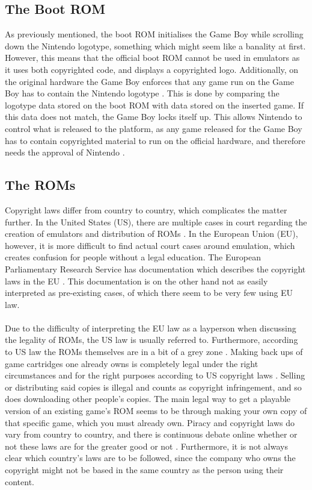 \subsection{The Boot ROM}
As previously mentioned, the boot ROM initialises the Game Boy while scrolling down the Nintendo logotype, something which might seem like a banality at first. However, this means that the official boot ROM cannot be used in emulators as it uses both copyrighted code, and displays a copyrighted logo. Additionally, on the original hardware the Game Boy enforces that any game run on the Game Boy has to contain the Nintendo logotype \cite{GBTROM}. This is done by comparing the logotype data stored on the boot ROM with data stored on the inserted game. If this data does not match, the Game Boy locks itself up. This allows Nintendo to control what is released to the platform, as any game released for the Game Boy has to contain copyrighted material to run on the official hardware, and therefore needs the approval of Nintendo \cite{GBTROM}.

\subsection{The ROMs}
Copyright laws differ from country to country, which complicates the matter further. In the United States (US), there are multiple cases in court regarding the creation of emulators and distribution of ROMs \cite{euRomLegal}. In the European Union (EU), however, it is more difficult to find actual court cases around emulation, which creates confusion for people without a legal education. The European Parliamentary Research Service has documentation which describes the copyright laws in the EU \cite{euCopyright}. This documentation is on the other hand not as easily interpreted as pre-existing cases, of which there seem to be very few using EU law.
\\\\
Due to the difficulty of interpreting the EU law as a layperson when discussing the legality of ROMs, the US law is usually referred to. Furthermore, according to US law the ROMs themselves are in a bit of a grey zone \cite{romLegal}. Making back ups of game cartridges one already owns is completely legal under the right circumstances and for the right purposes according to US copyright laws \cite{section117}. Selling or distributing said copies is illegal and counts as copyright infringement, and so does downloading other people's copies. The main legal way to get a playable version of an existing game's ROM seems to be through making your own copy of that specific game, which you must already own. Piracy and copyright laws do vary from country to country, and there is continuous debate online whether or not these laws are for the greater good or not \cite{emulatorPodcast}. Furthermore, it is not always clear which country's laws are to be followed, since the company who owns the copyright might not be based in the same country as the person using their content.

